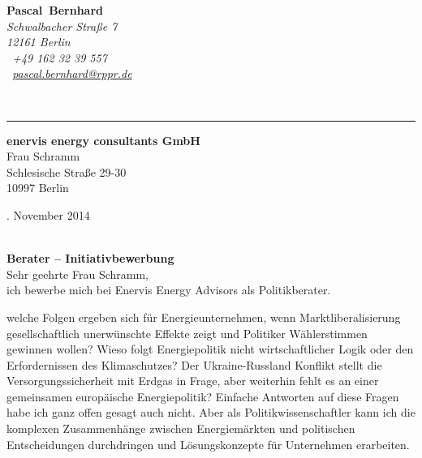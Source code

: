 \documentclass[11pt,a4paper]{article}
\def\firstname{Pascal}
\def\familyname{Bernhard}
\begin{document}
\sffamily   %
\hfill%
\begin{minipage}[t]{.6\textwidth}
	\raggedleft%
	{\bfseries {\color{firstnamecolor}\firstname}~{\color{familynamecolor}\familyname}}\\[.35ex]
	\small\itshape%
	Schwalbacher Straße 7\\
	12161 Berlin\\[.35ex]
	\Mobilefone~+49 162 32 39 557 \\
	\Letter~\href{mailto:pascal.bernhard@rppr.de}{pascal.bernhard@rppr.de}
\end{minipage}\\[0.5em]
%
{\color{firstnamecolor}\rule{\textwidth}{.25ex}}
%
\begin{minipage}[t]{.4\textwidth}
	\raggedright%
	\vspace*{1em}
	\textbf{enervis energy consultants GmbH} \\
	Frau Schramm \\[.35ex]
	\small%
	Schlesische Straße 29-30\\
	10997 Berlin
\end{minipage}
%
\hfill
%
\begin{minipage}[t]{.4\textwidth}
	. November 2014
\end{minipage}\\[1em]


{\bfseries \color{familynamecolor}Berater -- Initiativbewerbung}\\[0.75em]

Sehr geehrte Frau Schramm,\\[0.5em]
%
ich bewerbe mich bei Enervis Energy Advisors als Politikberater.


welche Folgen ergeben sich für Energieunternehmen, wenn Marktliberalisierung gesellschaftlich unerwünschte Effekte zeigt und Politiker Wählerstimmen gewinnen wollen? Wieso folgt Energiepolitik nicht wirtschaftlicher Logik oder den Erfordernissen des Klimaschutzes? Der Ukraine-Russland Konflikt stellt die Versorgungssicherheit mit Erdgas in Frage, aber weiterhin fehlt es an einer gemeinsamen europäische Energiepolitik? Einfache Antworten auf diese Fragen habe ich ganz offen gesagt auch nicht. Aber als Politikwissenschaftler kann ich die komplexen Zusammenhänge zwischen Energiemärkten und politischen Entscheidungen durchdringen und Lösungskonzepte für Unternehmen erarbeiten.
\end{document}
